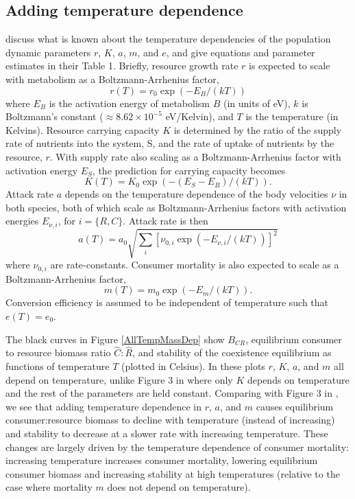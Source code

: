 \documentclass[11pt]{article}
\begin{document}
\subsection*{Adding temperature dependence}

\cite{Gilbert2014} discuss what is known about the temperature dependencies of the population dynamic parameters $r$, $K$, $a$, $m$, and $e$, and give equations and parameter estimates in their Table 1.
Briefly, resource growth rate $r$ is expected to scale with metabolism as a Boltzmann-Arrhenius factor, \[r(T) = r_0 \exp(-E_B/(kT))\] where $E_B$ is the activation energy of metabolism $B$ (in units of eV), $k$ is Boltzmann's constant ($\approx 8.62 \times 10^{-5}$ eV/Kelvin), and $T$ is the temperature (in Kelvins).
Resource carrying capacity $K$ is determined by the ratio of the supply rate of nutrients into the system, S, and the rate of uptake of nutrients by the resource, $r$.
With supply rate also scaling as a Boltzmann-Arrhenius factor with activation energy $E_S$, the prediction for carrying capacity becomes  \[K(T) = K_0 \exp(-(E_S - E_B)/(kT)).\] 
Attack rate $a$ depends on the temperature dependence of the body velocities $\nu$ in both species, both of which scale as Boltzmann-Arrhenius factors with activation energies $E_{\nu,i}$, for $i=\{R,C\}$.
Attack rate is then \[a(T) = a_0 \sqrt{\sum_i \left[\nu_{0,i} \exp(-E_{\nu,i}/(kT)) \right]^2}\] where $\nu_{0,i}$ are rate-constants.
Consumer mortality is also expected to scale as a Boltzmann-Arrhenius factor, \[m(T) = m_0 \exp(-E_m/(kT)).\]
Conversion efficiency is assumed to be independent of temperature such that $e(T) = e_0$.

The black curves in Figure \ref{AllTempMassDep} show $B_{CR}$, equilibrium consumer to resource biomass ratio $\hat{C}:\hat{R}$, and stability of the coexistence equilibrium as functions of temperature $T$ (plotted in Celsius).
In these plots $r$, $K$, $a$, and $m$ all depend on temperature, unlike Figure 3 in \cite{Gilbert2014} where only $K$ depends on temperature and the rest of the parameters are held constant.
Comparing with Figure 3 in \cite{Gilbert2014}, we see that adding temperature dependence in $r$, $a$, and $m$ causes equilibrium consumer:resource biomass to decline with temperature (instead of increasing) and stability to decrease at a slower rate  with increasing temperature.
These changes are largely driven by the temperature dependence of consumer mortality: increasing temperature increases consumer mortality, lowering equilibrium consumer biomass and increasing stability at high temperatures (relative to the case where mortality $m$ does not depend on temperature).
%
%
\end{document}
